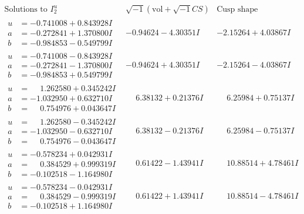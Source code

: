 \documentclass[1p]{elsarticle_modified}
\theoremstyle{definition}
\newcommand{\I}{\sqrt{-1}}
\begin{document}
$$\begin{array}{c|c|c}  
\text{Solutions to }I^u_{2}& \I (\text{vol} + \sqrt{-1}CS) & \text{Cusp shape}\\
 \hline 
\begin{aligned}
u &= -0.741008 + 0.843928 I \\
a &= -0.272841 + 1.370800 I \\
b &= -0.984853 - 0.549799 I\end{aligned}
 & -0.94624 - 4.30351 I & -2.15264 + 4.03867 I \\ \hline\begin{aligned}
u &= -0.741008 - 0.843928 I \\
a &= -0.272841 - 1.370800 I \\
b &= -0.984853 + 0.549799 I\end{aligned}
 & -0.94624 + 4.30351 I & -2.15264 - 4.03867 I \\ \hline\begin{aligned}
u &= \phantom{-}1.262580 + 0.345242 I \\
a &= -1.032950 + 0.632710 I \\
b &= \phantom{-}0.754976 + 0.043647 I\end{aligned}
 & \phantom{-}6.38132 + 0.21376 I & \phantom{-}6.25984 + 0.75137 I \\ \hline\begin{aligned}
u &= \phantom{-}1.262580 - 0.345242 I \\
a &= -1.032950 - 0.632710 I \\
b &= \phantom{-}0.754976 - 0.043647 I\end{aligned}
 & \phantom{-}6.38132 - 0.21376 I & \phantom{-}6.25984 - 0.75137 I \\ \hline\begin{aligned}
u &= -0.578234 + 0.042931 I \\
a &= \phantom{-}0.384529 + 0.999319 I \\
b &= -0.102518 - 1.164980 I\end{aligned}
 & \phantom{-}0.61422 - 1.43941 I & \phantom{-}10.88514 + 4.78461 I \\ \hline\begin{aligned}
u &= -0.578234 - 0.042931 I \\
a &= \phantom{-}0.384529 - 0.999319 I \\
b &= -0.102518 + 1.164980 I\end{aligned}
 & \phantom{-}0.61422 + 1.43941 I & \phantom{-}10.88514 - 4.78461 I \\ \hline\begin{aligned}

\end{aligned}
\end{array}$$
\end{document}
